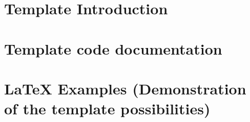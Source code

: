 \newcommand\argument[1]{$\langle${\normalfont\slshape#1}$\rangle$}
\part{Template Introduction}


\part{Template code documentation}


\part{LaTeX Examples (Demonstration of the template possibilities)}




